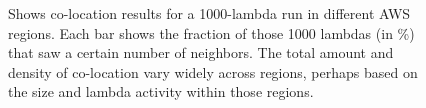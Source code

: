 \begin{figure}[!t]
\begin{subfigure}{.33\textwidth}
\end{subfigure}
\caption{Shows co-location results for a 1000-lambda run in different AWS regions. Each bar shows the fraction 
of those 1000 lambdas (in \%) that saw a certain number of neighbors. The total amount and density of co-location 
vary widely across regions, perhaps based on the size and lambda activity within those regions. }
\label{fig:awsregions}
\end{figure}



